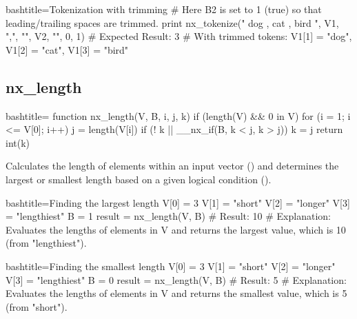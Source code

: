 \begin{NexCodeBox}{bash}{title={Tokenization with trimming}}
    # Here B2 is set to 1 (true) so that leading/trailing spaces are trimmed.
    print nx_tokenize("  dog , cat ,  bird  ", V1, ",", "", V2, "", 0, 1)
    # Expected Result: 3
    # With trimmed tokens: V1[1] = "dog", V1[2] = "cat", V1[3] = "bird"
\end{NexCodeBox}

\newpage
\subsection{nx_length}
\label{nx_length}
\begin{NexCodeBox}{bash}{title={}}
function nx_length(V, B,	i, j, k)
{
	if (length(V) && 0 in V) {
		for (i = 1; i <= V[0]; i++) {
			j = length(V[i])
			if (! k || __nx_if(B, k < j, k > j))
				k = j
		}
		return int(k)
	}
}
\end{NexCodeBox}

\begin{NexMainBox}
	\begin{NexMainBox}
		Calculates the length of elements within an input vector () and determines the largest or smallest length based on a given logical condition ().
	\end{NexMainBox}
	\begin{NexMainBox}
		\begin{NexListDark}
		\end{NexListDark}
	\end{NexMainBox}
\end{NexMainBox}

\begin{NexCodeBox}{bash}{title={Finding the largest length}}
	V[0] = 3
	V[1] = "short"
	V[2] = "longer"
	V[3] = "lengthiest"
	B = 1
	result = nx_length(V, B)
	# Result: 10
	# Explanation: Evaluates the lengths of elements in V and returns the largest value, which is 10 (from "lengthiest").
\end{NexCodeBox}

\begin{NexCodeBox}{bash}{title={Finding the smallest length}}
	V[0] = 3
	V[1] = "short"
	V[2] = "longer"
	V[3] = "lengthiest"
	B = 0
	result = nx_length(V, B)
	# Result: 5
	# Explanation: Evaluates the lengths of elements in V and returns the smallest value, which is 5 (from "short").
\end{NexCodeBox}

